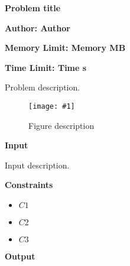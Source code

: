 \documentclass{article}
\newenvironment{ConstraintList}
{
	\vspace{-2mm}
	\begin{itemize}
}
{
	\end{itemize}
}
\newcommand{\englishProblemHeader}[4]{
	\begin{center} {\huge \sf \bfseries #1} \end{center}
	\vspace{-2mm}
	\centerline{\sf \bfseries Author: #2}
	\vspace{1mm}
	\centerline{\sf \bfseries Memory Limit: #3}
	\vspace{1mm}
	\centerline{\sf \bfseries Time Limit: #4}
	\vspace{10mm}
}
\newcommand{\printSubtitle}[1]{
	\vspace{1mm}
	\begin{flushleft} {\Large \sf \bfseries #1 \newline} \end{flushleft}
	\vspace{-4mm}
}
\newcommand{\image}[4]{
	\begin{figure}[h]
		\centering
		\texttt{[image: \#1]}
		\caption{#4}
	\end{figure}
}
\begin{document}


\englishProblemHeader{Problem title}{Author}{Memory MB}{Time s}




Problem description.
\newline

\image{images/figure-1.png}{9.6cm}{8cm}{Figure description}




\printSubtitle{Input}

Input description.
\newline




\printSubtitle{Constraints}

\begin{ConstraintList}
	\item $ C1 $
	\item $ C2 $
	\item $ C3 $
\end{ConstraintList}




\printSubtitle{Output}
\end{document}
